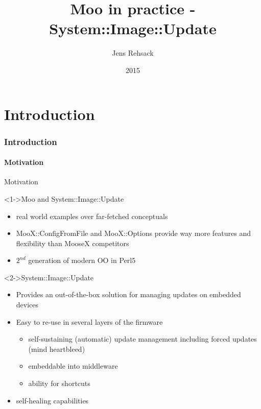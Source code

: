 \documentclass[ngerman,xcolor={table,dvipsnames},smaller,compress,hyperref={bookmarks,colorlinks},handout]{beamer}%
\title{Moo in practice - System::Image::Update}
\author{Jens Rehsack}
\institute[Niederrhein.PM]{Niederrhein Perl Mongers}
\date{2015}
\begin{document}


\frame{\maketitle}

\part{Introduction}

\section{Introduction}

\subsection{Motivation}

\begin{frame}[t,fragile]{Motivation}

\begin{block}<1->{Moo and System::Image::Update}
\begin{itemize}
\item real world examples over far-fetched conceptuals
\item MooX::ConfigFromFile and MooX::Options provide way more features and flexibility than MooseX competitors
\item $ 2^{nd} $ generation of modern OO in Perl5
\end{itemize}
\end{block}

\begin{block}<2->{System::Image::Update}
\begin{itemize}
\item Provides an out-of-the-box solution for managing updates on embedded devices
\item Easy to re-use in several layers of the firmware
    \begin{itemize}
    \item self-sustaining (automatic) update management including forced updates (mind heartbleed)
    \item embeddable into middleware
    \item ability for shortcuts
    \end{itemize}
\item self-healing capabilities
\end{itemize}
\end{block}

\end{frame}
\end{document}
